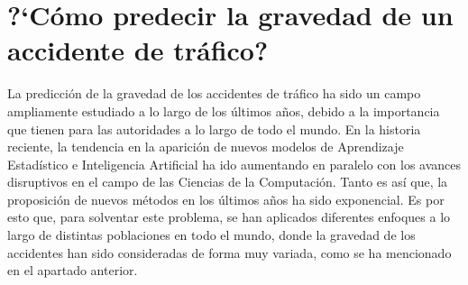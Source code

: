 \documentclass{uathesis-es}
\begin{document}
	
	
	\section{?`Cómo predecir la gravedad de un accidente de tráfico?}
	
	
	
	
	
	La predicción de la gravedad de los accidentes de tráfico ha sido un campo ampliamente estudiado a lo largo de los últimos años, debido a la importancia que tienen para las autoridades a lo largo de todo el mundo. En la historia reciente, la tendencia en la aparición de nuevos modelos de Aprendizaje Estadístico e Inteligencia Artificial ha ido aumentando en paralelo con los avances disruptivos en el campo de las Ciencias de la Computación. Tanto es así que, la proposición de nuevos métodos en los últimos años ha sido exponencial. Es por esto que, para solventar este problema, se han aplicados diferentes enfoques a lo largo de distintas poblaciones en todo el mundo, donde la gravedad de los accidentes han sido consideradas de forma muy variada, como se ha mencionado en el apartado anterior.
	
\end{document}
